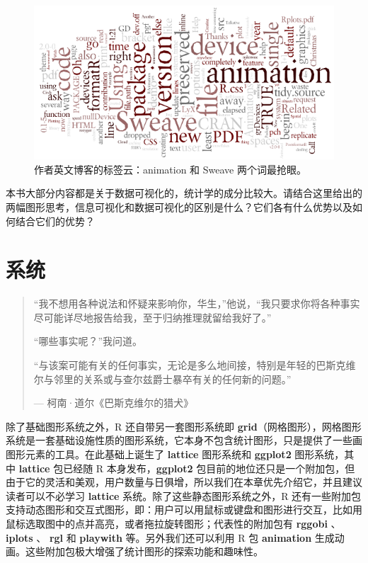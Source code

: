 \documentclass[
  b5paper,
  UTF8,twoside]{book}
\begin{document}
\begin{enumerate}
  \begin{figure}

  {\centering \includegraphics{images/yihui-name-wordle} 

  }

  \caption[作者英文博客的标签云]{作者英文博客的标签云：animation 和 Sweave 两个词最抢眼。}\label{fig:yihui-name-wordle}
  \end{figure}

  本书大部分内容都是关于数据可视化的，统计学的成分比较大。请结合这里给出的两幅图形思考，信息可视化和数据可视化的区别是什么？它们各有什么优势以及如何结合它们的优势？
\end{enumerate}









\chapter{系统}\label{chap:system}

\begin{quote}
``我不想用各种说法和怀疑来影响你，华生，''他说，``我只要求你将各种事实尽可能详尽地报告给我，至于归纳推理就留给我好了。''

``哪些事实呢？''我问道。

``与该案可能有关的任何事实，无论是多么地间接，特别是年轻的巴斯克维尔与邻里的关系或与查尔兹爵士暴卒有关的任何新的问题。''

\hspace*{\fill} --- 柯南·道尔《巴斯克维尔的猎犬》
\end{quote}

除了基础图形系统之外，R 还自带另一套图形系统即 \textbf{grid}（网格图形），网格图形系统是一套基础设施性质的图形系统，它本身不包含统计图形，只是提供了一些画图形元素的工具。在此基础上诞生了 \textbf{lattice} 图形系统和 \textbf{ggplot2} 图形系统，其中 \textbf{lattice} 包已经随 R 本身发布，\textbf{ggplot2} 包目前的地位还只是一个附加包，但由于它的灵活和美观，用户数量与日俱增，所以我们在本章优先介绍它，并且建议读者可以不必学习 \textbf{lattice} 系统。除了这些静态图形系统之外，R 还有一些附加包支持动态图形和交互式图形，即：用户可以用鼠标或键盘和图形进行交互，比如用鼠标选取图中的点并高亮，或者拖拉旋转图形；代表性的附加包有 \textbf{rggobi} 、 \textbf{iplots} 、 \textbf{rgl} 和 \textbf{playwith} 等。另外我们还可以利用 R 包 \textbf{animation} 生成动画。这些附加包极大增强了统计图形的探索功能和趣味性。
\end{document}
